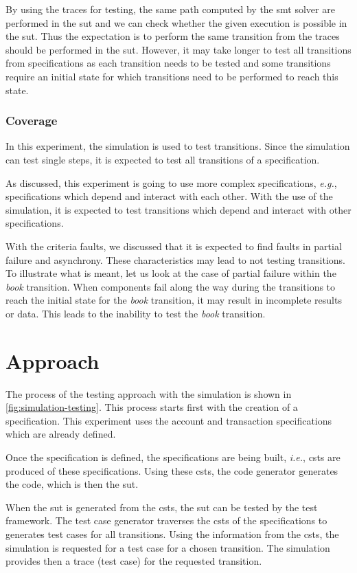 By using the traces for testing, the same path computed by the \gls{smt} solver
are performed in the \gls{sut} and we can check whether the given
execution is possible in the \gls{sut}. Thus the expectation is to perform the
same transition from the traces should be performed in the \gls{sut}.
However, it may take longer to test all transitions from specifications as each
transition needs to be tested and some transitions require an initial state for
which transitions need to be performed to reach this state.

\subsubsection{Coverage}
In this experiment, the simulation is used to test transitions. Since
the simulation can test single steps, it is expected to test all
transitions of a specification.

As discussed, this experiment is going to use more complex specifications,
\textit{e.g.}, specifications which depend and interact with each other. With
the use of the simulation, it is expected to test transitions which depend and
interact with other specifications.

With the criteria faults, we discussed that it is expected to find faults in
partial failure and asynchrony. These characteristics may lead to not testing
transitions. To illustrate what is meant, let us look at the case of partial
failure within the \textit{book} transition. When components fail along the way
during the transitions to reach the initial state for the \textit{book}
transition, it may result in incomplete results or data. This leads to the
inability to test the \textit{book} transition.

\section{Approach}

The process of the testing approach with the simulation is shown in
\autoref{fig:simulation-testing}. This process starts first with the creation of
a specification. This experiment uses the account and transaction specifications
which are already defined.

Once the specification is defined, the specifications
are being built, \textit{i.e.}, \gls{csts} are produced of
these specifications. Using these \gls{csts}, the code generator generates the code,
which is then the \gls{sut}.

When the \gls{sut} is generated from the \gls{csts}, the \gls{sut} can be tested by the test
framework. The test case generator traverses the \gls{csts} of the specifications to
generates test cases for all transitions. Using the information from the \gls{csts},
the simulation is requested for a test case for a chosen transition. The
simulation provides then a trace (test case) for the requested transition.

